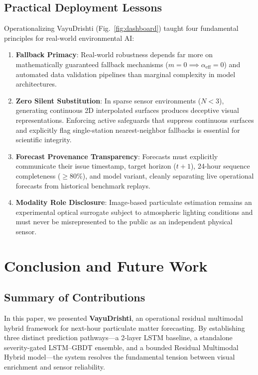 \documentclass[conference]{IEEEtran}
\begin{document}
\subsection{Practical Deployment Lessons}
Operationalizing VayuDrishti (Fig.~\ref{fig:dashboard}) taught four fundamental principles for real-world environmental AI:
\begin{enumerate}
    \item \textbf{Fallback Primacy}: Real-world robustness depends far more on mathematically guaranteed fallback mechanisms ($m=0 \implies \alpha_{\text{eff}}=0$) and automated data validation pipelines than marginal complexity in model architectures.
    \item \textbf{Zero Silent Substitution}: In sparse sensor environments ($N < 3$), generating continuous 2D interpolated surfaces produces deceptive visual representations. Enforcing active safeguards that suppress continuous surfaces and explicitly flag single-station nearest-neighbor fallbacks is essential for scientific integrity.
    \item \textbf{Forecast Provenance Transparency}: Forecasts must explicitly communicate their issue timestamp, target horizon ($t+1$), 24-hour sequence completeness ($\ge 80\%$), and model variant, cleanly separating live operational forecasts from historical benchmark replays.
    \item \textbf{Modality Role Disclosure}: Image-based particulate estimation remains an experimental optical surrogate subject to atmospheric lighting conditions and must never be misrepresented to the public as an independent physical sensor.
\end{enumerate}

\section{Conclusion and Future Work}
\label{sec:conclusion}

\subsection{Summary of Contributions}
In this paper, we presented \textbf{VayuDrishti}, an operational residual multimodal hybrid framework for next-hour particulate matter forecasting. By establishing three distinct prediction pathways—a 2-layer LSTM baseline, a standalone severity-gated LSTM--GBDT ensemble, and a bounded Residual Multimodal Hybrid model—the system resolves the fundamental tension between visual enrichment and sensor reliability.
\end{document}
